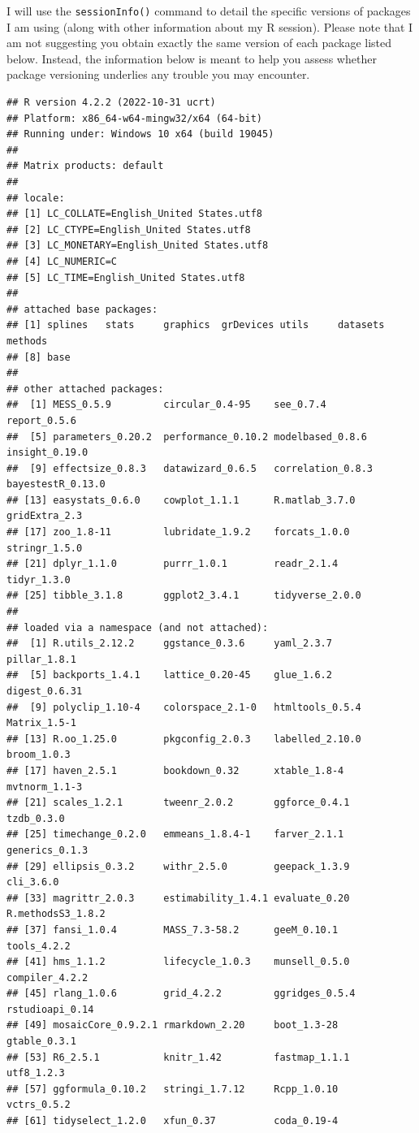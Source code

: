\documentclass[
]{book}
\begin{document}
I will use the \texttt{sessionInfo()} command to detail the specific versions of
packages I am using (along with other information about my R session). Please
note that I am not suggesting you obtain exactly the same version of each
package listed below. Instead, the information below is meant to help you assess
whether package versioning underlies any trouble you may encounter.

\begin{verbatim}
## R version 4.2.2 (2022-10-31 ucrt)
## Platform: x86_64-w64-mingw32/x64 (64-bit)
## Running under: Windows 10 x64 (build 19045)
## 
## Matrix products: default
## 
## locale:
## [1] LC_COLLATE=English_United States.utf8 
## [2] LC_CTYPE=English_United States.utf8   
## [3] LC_MONETARY=English_United States.utf8
## [4] LC_NUMERIC=C                          
## [5] LC_TIME=English_United States.utf8    
## 
## attached base packages:
## [1] splines   stats     graphics  grDevices utils     datasets  methods  
## [8] base     
## 
## other attached packages:
##  [1] MESS_0.5.9         circular_0.4-95    see_0.7.4          report_0.5.6      
##  [5] parameters_0.20.2  performance_0.10.2 modelbased_0.8.6   insight_0.19.0    
##  [9] effectsize_0.8.3   datawizard_0.6.5   correlation_0.8.3  bayestestR_0.13.0 
## [13] easystats_0.6.0    cowplot_1.1.1      R.matlab_3.7.0     gridExtra_2.3     
## [17] zoo_1.8-11         lubridate_1.9.2    forcats_1.0.0      stringr_1.5.0     
## [21] dplyr_1.1.0        purrr_1.0.1        readr_2.1.4        tidyr_1.3.0       
## [25] tibble_3.1.8       ggplot2_3.4.1      tidyverse_2.0.0   
## 
## loaded via a namespace (and not attached):
##  [1] R.utils_2.12.2     ggstance_0.3.6     yaml_2.3.7         pillar_1.8.1      
##  [5] backports_1.4.1    lattice_0.20-45    glue_1.6.2         digest_0.6.31     
##  [9] polyclip_1.10-4    colorspace_2.1-0   htmltools_0.5.4    Matrix_1.5-1      
## [13] R.oo_1.25.0        pkgconfig_2.0.3    labelled_2.10.0    broom_1.0.3       
## [17] haven_2.5.1        bookdown_0.32      xtable_1.8-4       mvtnorm_1.1-3     
## [21] scales_1.2.1       tweenr_2.0.2       ggforce_0.4.1      tzdb_0.3.0        
## [25] timechange_0.2.0   emmeans_1.8.4-1    farver_2.1.1       generics_0.1.3    
## [29] ellipsis_0.3.2     withr_2.5.0        geepack_1.3.9      cli_3.6.0         
## [33] magrittr_2.0.3     estimability_1.4.1 evaluate_0.20      R.methodsS3_1.8.2 
## [37] fansi_1.0.4        MASS_7.3-58.2      geeM_0.10.1        tools_4.2.2       
## [41] hms_1.1.2          lifecycle_1.0.3    munsell_0.5.0      compiler_4.2.2    
## [45] rlang_1.0.6        grid_4.2.2         ggridges_0.5.4     rstudioapi_0.14   
## [49] mosaicCore_0.9.2.1 rmarkdown_2.20     boot_1.3-28        gtable_0.3.1      
## [53] R6_2.5.1           knitr_1.42         fastmap_1.1.1      utf8_1.2.3        
## [57] ggformula_0.10.2   stringi_1.7.12     Rcpp_1.0.10        vctrs_0.5.2       
## [61] tidyselect_1.2.0   xfun_0.37          coda_0.19-4
\end{verbatim}
\end{document}
